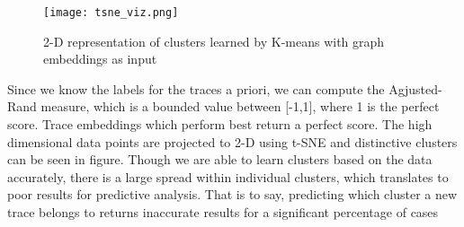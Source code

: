  
 \begin{figure}
\texttt{[image: tsne\_viz.png]}
\caption{2-D representation of clusters learned by K-means with graph embeddings as input}
\label{Clusters}
\end{figure}
 
Since we know the labels for the traces a priori, we can compute the Agjusted-Rand measure, which is a bounded value between [-1,1], where 1 is the perfect score.  Trace embeddings which perform best return a perfect score. The high dimensional data points are projected to 2-D using t-SNE and distinctive clusters can be seen in figure. Though we are able to learn clusters based on the data accurately, there is a large spread within individual clusters, which translates to poor results for predictive analysis. That is to say, predicting which cluster a new trace belongs to returns inaccurate results for a significant percentage of cases

